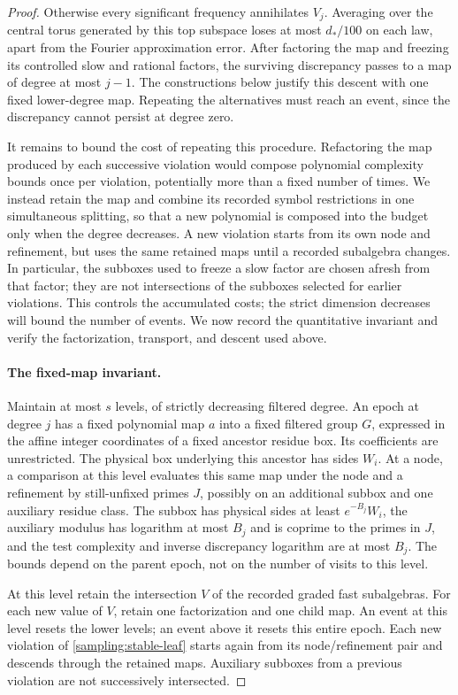 \begin{proof}
Otherwise every significant frequency annihilates $V_j$.  Averaging
over the central torus generated by this top subspace loses at most $d_*/100$
on each law, apart from the Fourier approximation error.  After
factoring the map and freezing its controlled slow and rational
factors, the surviving discrepancy passes to a map of degree at
most $j-1$.  The constructions below justify this descent with one
fixed lower-degree map.  Repeating the alternatives must reach an
event, since the discrepancy cannot persist at degree zero.

It remains to bound the cost of repeating this procedure.
Refactoring the map produced by each successive violation would
compose polynomial complexity bounds once per violation, potentially
more than a fixed number of times.  We instead retain the map and
combine its recorded symbol restrictions in one simultaneous
splitting, so that a new polynomial is composed into the budget only
when the degree decreases.  A new
violation starts from its own node and refinement, but uses the same
retained maps until a recorded subalgebra changes.  In particular,
the subboxes used to freeze a slow factor are chosen afresh from
that factor; they are not intersections of the subboxes selected
for earlier violations. This controls the accumulated costs; the
strict dimension decreases will bound the number of events. We now
record the quantitative invariant and verify the factorization,
transport, and descent used above.

\paragraph{The fixed-map invariant.}
Maintain at most $s$ levels, of strictly decreasing filtered degree.
An epoch at degree $j$ has a fixed polynomial map $a$ into a fixed
filtered group $G$, expressed in the affine integer coordinates of
a fixed ancestor residue box.  Its coefficients are unrestricted.
The physical box underlying this ancestor has sides $W_i$.
At a node, a comparison at this level evaluates this same map under
the node and a refinement by still-unfixed primes $J$, possibly on
an additional subbox and one auxiliary residue class.  The subbox
has physical sides at least $e^{-B_j}W_i$, the auxiliary modulus
has logarithm at most $B_j$ and is coprime to the primes in $J$,
and the test complexity and inverse discrepancy logarithm are at
most $B_j$.  The bounds depend on the parent epoch, not on the
number of visits to this level.

At this level retain the intersection $V$ of the recorded graded
fast subalgebras.  For each new value of $V$, retain one factorization
and one child map.  An event at this level resets the lower levels;
an event above it resets this entire epoch.  Each new violation of
\eqref{sampling:stable-leaf} starts again from its node/refinement
pair and descends through the retained maps.  Auxiliary subboxes
from a previous violation are not successively intersected.


\end{proof}
